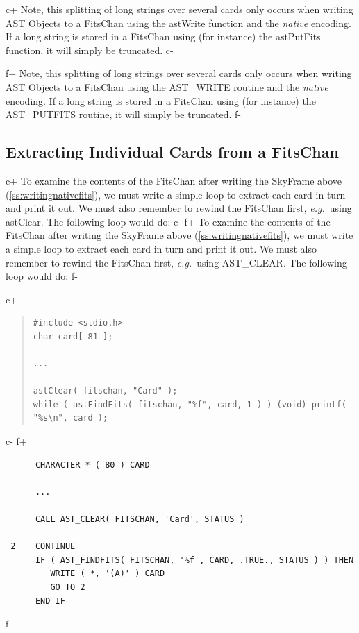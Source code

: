 \documentclass[twoside,11pt]{article}
\newcommand{\secref}[1]{\S\ref{#1}}
\renewcommand{\secref}[1]{\ref{#1}}
\begin{document}
c+
Note, this splitting of long strings over several cards only occurs when
writing AST Objects to a FitsChan using the astWrite function and the
{\em native} encoding. If a long string is stored in a FitsChan using
(for instance) the astPutFits function, it will simply be truncated.
c- 

f+
Note, this splitting of long strings over several cards only occurs when
writing AST Objects to a FitsChan using the AST\_WRITE routine and the
{\em native} encoding. If a long string is stored in a FitsChan using
(for instance) the AST\_PUTFITS routine, it will simply be truncated.
f- 

\subsection{\label{ss:extractingfitscards}Extracting Individual Cards from a FitsChan}

c+
To examine the contents of the FitsChan after writing the SkyFrame
above (\secref{ss:writingnativefits}), we must write a simple loop to
extract each card in turn and print it out. We must also remember to
rewind the FitsChan first, {\em{e.g.}}\ using astClear. The following
loop would do:
c-
f+
To examine the contents of the FitsChan after writing the SkyFrame
above (\secref{ss:writingnativefits}), we must write a simple loop to
extract each card in turn and print it out. We must also remember to
rewind the FitsChan first, {\em{e.g.}}\ using AST\_CLEAR. The
following loop would do:
f-

c+
\begin{quote}
\small
\begin{verbatim}
#include <stdio.h>
char card[ 81 ];

...

astClear( fitschan, "Card" );
while ( astFindFits( fitschan, "%f", card, 1 ) ) (void) printf( "%s\n", card );
\end{verbatim}
\normalsize
\end{quote}
c-
f+
\small
\begin{verbatim}
      CHARACTER * ( 80 ) CARD

      ...

      CALL AST_CLEAR( FITSCHAN, 'Card', STATUS )

 2    CONTINUE
      IF ( AST_FINDFITS( FITSCHAN, '%f', CARD, .TRUE., STATUS ) ) THEN
         WRITE ( *, '(A)' ) CARD
         GO TO 2
      END IF
\end{verbatim}
\normalsize
f-
\end{document}
